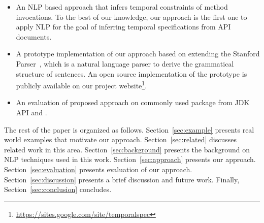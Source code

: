 \begin{itemize}
	\item An NLP based approach that infers temporal constraints of method invocations. 
	To the best of our knowledge, our approach is the first one to apply NLP for the goal of inferring temporal specifications from API documents.
	\item A prototype implementation of our approach based on extending the Stanford Parser~\cite{Klein03,SNLP1}, which is a natural language parser to derive the grammatical structure of sentences.
	An open source implementation of the prototype is publicly available on our project website\footnote{\url{https://sites.google.com/site/temporalspec}}. 
	\item An evaluation of proposed approach on commonly used package  from JDK API and \amazonAPI. 
\end{itemize}


The rest of the paper is organized as follows.
Section~\ref{sec:example} presents real world examples that motivate our approach.
Section~\ref{sec:related} discusses related work in this area.
Section~\ref{sec:background} presents the  background on NLP techniques used in this work.
Section~\ref{sec:approach} presents our approach.
Section~\ref{sec:evaluation} presents evaluation of our approach.
Section~\ref{sec:discussion} presents a brief discussion and future work.
Finally, Section~\ref{sec:conclusion} concludes.


